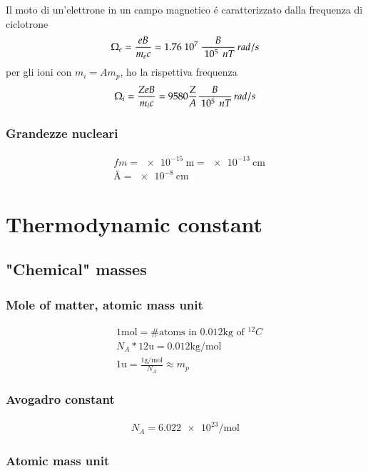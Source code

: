 \documentclass[main.tex]{subfiles}
\begin{document}
Il moto di un'elettrone in un campo magnetico \'e caratterizzato dalla frequenza di ciclotrone
\begin{equation*}
\Omega_e=\frac{eB}{m_ec}=1.76\ 10^{7}\ \frac{B}{\ 10^{5}\ \,nT}\,rad/s
\end{equation*}
per gli ioni con $m_i=Am_p$, ho la rispettiva frequenza
\begin{equation*}
\Omega_i=\frac{ZeB}{m_ic}=9580\frac{Z}{A}\frac{B}{\ 10^{5}\ \,nT}\,rad/s
\end{equation*}

\subsection{Grandezze nucleari}

\begin{align*}
&fm=\SI{e-15}{\meter}=\SI{e-13}{\cm}\\
&\si{\angstrom}=\SI{e-8}{\cm}
\end{align*}

\chapter{Thermodynamic constant}
\PartialToc

\section{"Chemical" masses}

\subsection{Mole of matter, atomic mass unit}
\begin{align*}
&1\si{\mole}=\# \text{atoms in }0.012\si{\kilo\gram}\text{ of $^{12}C$}\\
&N_A*12 \si{\atomicmassunit}=0.012\si{\kilo\gram\per\mole}\\
&1\si{\atomicmassunit}=\frac{1\si{\gram\per\mole}}{N_A}\approx m_p
\end{align*}

\subsection{Avogadro constant}
\begin{align*}
N_A=\num{6.022e23}\si{\per\mole}
\end{align*}

\subsection{Atomic mass unit}
\end{document}
